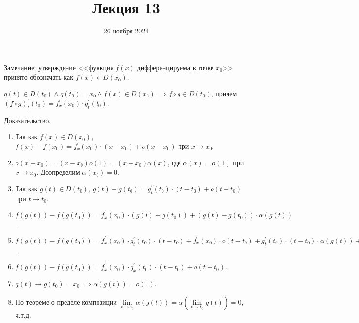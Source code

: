 \documentclass{article}
\title{Лекция 13}
\author{26 ноября 2024}
\date{}
\begin{document}
\maketitle

\noindent\underline{Замечание:} утверждение <<функция \(f(x)\) дифференцируема в точке \(x_0\)>> принято обозначать как \(f(x) \in D(x_0)\).   
\begin{theorem}
    \noindent\(g(t) \in D(t_0) \land g(t_0) = x_0 \land f(x) \in D(x_0) \implies f \circ g \in D(t_0)\), причем \(\displaystyle (f \circ g)^{\prime}_{t}(t_0) = f^{\prime}_{x}(x_0) \cdot g^{\prime}_{t}(t_0)\).  
\end{theorem}
\noindent\underline{Доказательство.}
\begin{enumerate}
    \item Так как \(f(x) \in D(x_0)\), \(f(x) - f(x_0) = f^{\prime}_x(x_0) \cdot (x - x_0) + o(x - x_0)\) при \(x \to x_0\).
    \item \(o(x -x _0) = (x - x_0)o(1) = (x - x_0)\alpha(x)\), где \(\alpha(x) = o(1)\) при \(x \to x_0\). Доопределим \(\alpha(x_0) = 0\).
    \item Так как \(g(t) \in D(t_0)\), \(g(t) - g(t_0) = g^{\prime}_t(t_0) \cdot (t - t_0) + o(t - t_0)\) при \(t \to t_0\).
    \item \(f(g(t)) - f(g(t_0)) = f^{\prime}_x(x_0) \cdot (g(t) - g(t_0)) + (g(t) - g(t_0)) \cdot \alpha(g(t))\).
    \item \(f(g(t)) - f(g(t_0)) = f^{\prime}_x(x_0) \cdot g^{\prime}_t(t_0) \cdot (t - t_0) + f^{\prime}_x(x_0) \cdot o(t - t_0) + g^{\prime}_t(t_0) \cdot (t - t_0) \cdot \alpha(g(t)) + o(t - t_0) \cdot \alpha(g(t))\).
    \item \(f(g(t)) - f(g(t_0)) = f^{\prime}_x(x_0) \cdot g^{\prime}_x(t_0) \cdot (t - t_0) + o(t - t_0)\).
    \item \(g(t) \to g(t_0) = x_0 \implies \alpha(g(t)) = o(1)\).
    \item По теореме о пределе композиции \( \lim\limits_{t \to t_0} \alpha(g(t)) = \alpha \left( \lim\limits_{t \to t_0} g(t) \right) = 0\), ч.т.д.   
\end{enumerate}
\end{document}
